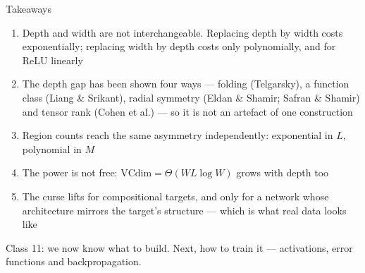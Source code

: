 \documentclass[aspectratio=169, 11pt]{beamer}
\begin{document}
\begin{frame}{Takeaways}
  \vspace{0.1em}
  {\footnotesize
  \begin{enumerate}\setlength{\itemsep}{2pt}
    \item Depth and width are \alert{not interchangeable}. Replacing
          depth by width costs \alert{exponentially}; replacing width
          by depth costs only \alert{polynomially}, and for ReLU
          linearly
    \item The depth gap has been shown four ways --- folding
          (Telgarsky), a function class (Liang \& Srikant), radial
          symmetry (Eldan \& Shamir; Safran \& Shamir) and tensor rank
          (Cohen et al.) --- so it is \alert{not an artefact of one
          construction}
    \item Region counts reach the same asymmetry independently:
          exponential in $L$, polynomial in $M$
    \item The power is not free: $\mathrm{VCdim}=\Theta(WL\log W)$
          grows with depth too
    \item The curse lifts for \alert{compositional} targets, and only
          for a network whose \alert{architecture mirrors} the target's
          structure --- which is what real data looks like
  \end{enumerate}}
  \vspace{0.2em}
  \begin{redhighlight}
    {\footnotesize Class 11: we now know what to build. Next, how to
    \alert{train} it --- activations, error functions and
    backpropagation.}
  \end{redhighlight}
\end{frame}
\end{document}
